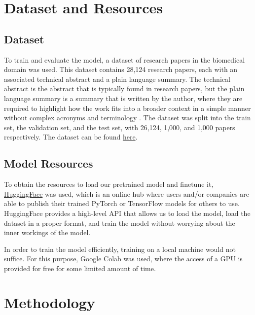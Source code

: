 \documentclass[11pt,a4paper]{article}
\begin{document}
\section{Dataset and Resources}
\subsection{Dataset}
\indent \indent To train and evaluate the model, a dataset of research papers in the biomedical domain was used. This dataset contains 28,124 research papers, each with an associated technical abstract and a plain language summary. The technical abstract is the abstract that is typically found in research papers, but the plain language summary is a summary that is written by the author, where they are required to highlight how the work fits into a broader context in a simple manner without complex acronyms and terminology \cite{luo2022readability}. The dataset was split into the train set, the validation set, and the test set, with 26,124, 1,000, and 1,000 papers respectively. The dataset can be found \href{https://www.dropbox.
com/s/huwm01glsk9fou0/plos_readability_ctrl_sum_
corpus.rar?dl=0}{here}.

\subsection{Model Resources}

\indent \indent To obtain the resources to load our pretrained model and finetune it, \href{https://huggingface.co/}{HuggingFace} was used, which is an online hub where users and/or companies are able to publish their trained PyTorch or TensorFlow models for others to use. HuggingFace provides a high-level API that allows us to load the model, load the dataset in a proper format, and train the model without worrying about the inner workings of the model.

In order to train the model efficiently, training on a local machine would not suffice. For this purpose, \href{colab.research.google.com}{Google Colab} was used, where the access of a GPU is provided for free for some limited amount of time.

\section{Methodology}
\end{document}
